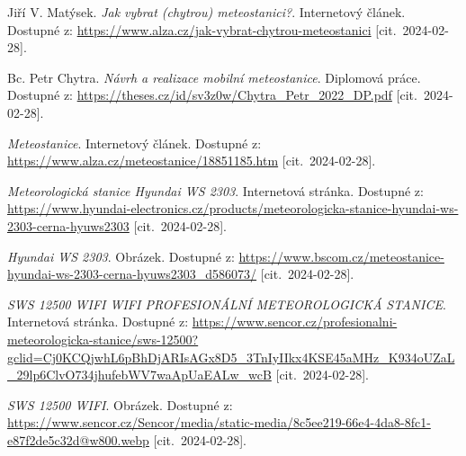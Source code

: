 \documentclass[twoside]{ctuthesis}
\theoremstyle{plain}
\theoremstyle{definition}
\theoremstyle{note}
\begin{document}
        \maketitle


        
        
        
        
        
        
        
        

\pagestyle{plain}
	
\begin{thebibliography}{99}
 Jiří V. Matýsek. {\it Jak vybrat (chytrou) meteostanici?}. Internetový článek. Dostupné z: \url{https://www.alza.cz/jak-vybrat-chytrou-meteostanici} [cit.~2024-02-28].

 Bc. Petr Chytra. {\it Návrh a realizace mobilní meteostanice}. Diplomová práce. Dostupné z: \url{https://theses.cz/id/sv3z0w/Chytra_Petr_2022_DP.pdf} [cit.~2024-02-28].

 {\it Meteostanice}. Internetový článek. Dostupné z: \url{https://www.alza.cz/meteostanice/18851185.htm} [cit.~2024-02-28].

 {\it Meteorologická stanice Hyundai WS 2303}. Internetová stránka. Dostupné z: \url{https://www.hyundai-electronics.cz/products/meteorologicka-stanice-hyundai-ws-2303-cerna-hyuws2303} [cit.~2024-02-28].

 {\it Hyundai WS 2303}. Obrázek. Dostupné z: \url{https://www.bscom.cz/meteostanice-hyundai-ws-2303-cerna-hyuws2303_d586073/} [cit.~2024-02-28].

 {\it SWS 12500 WIFI
WIFI PROFESIONÁLNÍ METEOROLOGICKÁ STANICE}. Internetová stránka. Dostupné z: \url{https://www.sencor.cz/profesionalni-meteorologicka-stanice/sws-12500?gclid=Cj0KCQjwhL6pBhDjARIsAGx8D5_3TnIyIIkx4KSE45aMHz_K934oUZaL_29lp6ClvO734jhufebWV7waApUaEALw_wcB} [cit.~2024-02-28].

 {\it SWS 12500 WIFI}. Obrázek. Dostupné z: \url{https://www.sencor.cz/Sencor/media/static-media/8c5ee219-66e4-4da8-8fc1-e87f2de5c32d@w800.webp} [cit.~2024-02-28].


\end{thebibliography}
\end{document}
